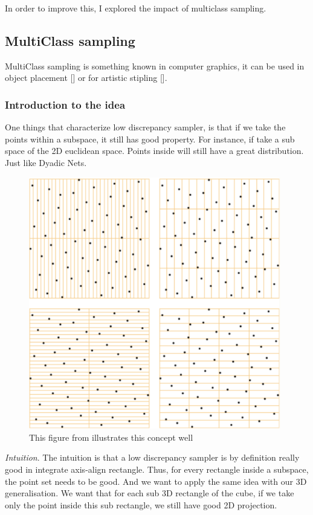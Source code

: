 \documentclass{classeENS}
\begin{document}
\> In order to improve this, I explored the impact of multiclass sampling.
    

\subsection{MultiClass sampling}

MultiClass sampling is something known in computer graphics, it can be used in
object placement [\cite{10.1145/1778765.1778816}] or for artistic stipling 
[\cite{10.1145/3478513.3480534}].

\subsubsection{Introduction to the idea}
    One things that characterize low discrepancy sampler, is that if we take the points
    within a subspace, it still has good property. For instance, if take a sub space of the
    2D euclidean space. Points inside will still have a great distribution. Just like Dyadic 
    Nets. 
    
    \begin{figure}[H]
        \centering
        \includegraphics[width=110mm]{target/diadic_nets.png}\\
        This figure from \cite{dyadic} illustrates this concept well
    \end{figure}    
    
    \> \textit{Intuition}. The intuition is that a low discrepancy sampler is by definition
        really good in integrate axis-align rectangle. Thus, for every rectangle inside a 
        subspace, the point set needs to be good. And we want to apply the same idea with
        our 3D generalisation. We want that for each sub 3D rectangle of the cube, if we
        take only the point inside this sub rectangle, we still have good 2D projection.  
\end{document}
